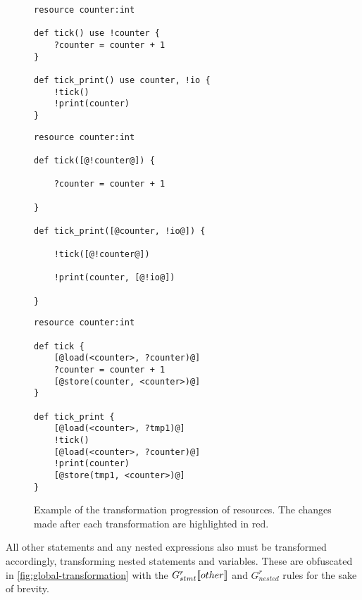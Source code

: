 \begin{figure}[bp]
  \centering
  \begin{minipage}[t]{\textwidth}
    \begin{lstlisting}
resource counter:int

def tick() use !counter {
    ?counter = counter + 1
}

def tick_print() use counter, !io {
    !tick()
    !print(counter)
}
\end{lstlisting}
  \end{minipage}
  \centering
  \begin{minipage}[t]{.48\textwidth}
    \begin{lstlisting}
resource counter:int

def tick([@!counter@]) {

    ?counter = counter + 1

}

def tick_print([@counter, !io@]) {
    
    !tick([@!counter@])
    
    !print(counter, [@!io@])

}
\end{lstlisting}
  \end{minipage}\hfill
  \begin{minipage}[t]{.48\textwidth}
    \begin{lstlisting}[numbers=none]
resource counter:int

def tick {
    [@load(<counter>, ?counter)@]
    ?counter = counter + 1
    [@store(counter, <counter>)@]
}

def tick_print {
    [@load(<counter>, ?tmp1)@]
    !tick()
    [@load(<counter>, ?counter)@]
    !print(counter)
    [@store(tmp1, <counter>)@]
}
\end{lstlisting}
  \end{minipage}
  \caption[Example of the transformation progression of resources.]{Example of the transformation progression of resources. The changes made after each transformation are highlighted in \textcolor{rred}{red}.}
  \label{lst:resource-progression}
\end{figure}

All other statements and any nested expressions also must be transformed accordingly, transforming nested statements and variables. These are obfuscated in \cref{fig:global-transformation} with the $G_{stmt}^r\bbrackets*{other}$ and $G_{nested}^r$ rules for the sake of brevity. 

